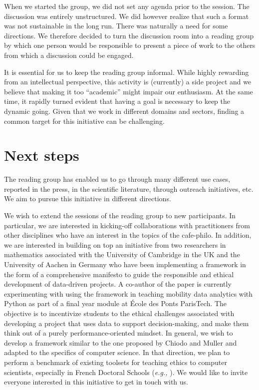\documentclass[journal]{IEEEtran}
\begin{document}
When we  started the  group, we did  not set any  agenda prior  to the
session.  The discussion  was  entirely unstructured.  We did  however
realize that such a format was  not sustainable in the long run. There
was naturally a need for some directions. We therefore decided to turn
the discussion room into a reading  group by which one person would be
responsible to  present a  piece of  work to the  others from  which a
discussion could be engaged.

It  is essential  for us  to keep  the reading  group informal.  While
highly rewarding  from an  intellectual perspective, this  activity is
(currently)  a  side  project  and  we  believe  that  making  it  too
“academic” might impair  our enthusiasm. At the same  time, it rapidly
turned evident  that having a  goal is  necessary to keep  the dynamic
going. Given that we work in  different domains and sectors, finding a
common target for this initiative can be challenging.

\section{Next steps}

The reading  group has  enabled us  to go  through many  different use
cases, reported  in the press,  in the scientific  literature, through
outreach  initiatives,  etc.  We  aim to  pursue  this  initiative  in
different directions.

We  wish  to  extend  the  sessions   of  the  reading  group  to  new
participants.  In   particular,  we  are  interested   in  kicking-off
collaborations with  practitioners from other disciplines  who have an
interest  in  the  topics  of  the cafe-philo.  In  addition,  we  are
interested in  building on top  an initiative from two  researchers in
mathematics associated with the University  of Cambridge in the UK and
the  University of  Aachen in  Germany  who have  been implementing  a
framework in the form of  a comprehensive manifesto \cite{Chiodo23} to
guide  the   responsible  and   ethical  development   of  data-driven
projects. A  co-author of  the paper  is currently  experimenting with
using the framework in teaching mobility data analytics with Python as
part  of  a final  year  module  at  École  des Ponts  ParisTech.  The
objective  is  to  incentivize  students  to  the  ethical  challenges
associated  with  developing  a  project that  uses  data  to  support
decision-making,   and    make   them   think   out    of   a   purely
performance-oriented  mindset.  In  general,  we  wish  to  develop  a
framework similar to the one proposed by Chiodo and Muller and adapted
to the  specifics of computer science.  In that direction, we  plan to
perform  a  benchmark of  existing  toolsets  for teaching  ethics  to
computer   scientists,   especially   in   French   Doctoral   Schools
(\textit{e.g.,} \cite{MoocEthics}).  We would like to  invite everyone
interested in this initiative to get in touch with us.
\end{document}
